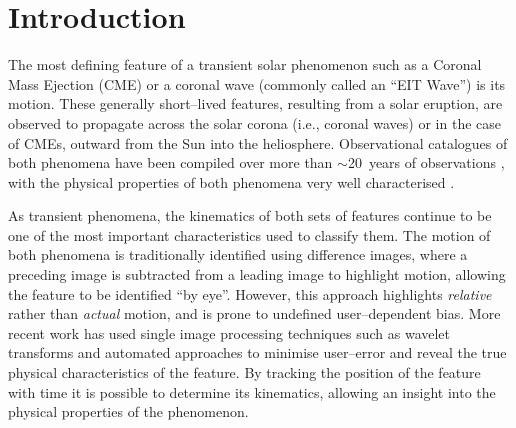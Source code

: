 \documentclass[structabstract]{aa}
\begin{document}
\maketitle

%

\section{Introduction}
\label{sect_intro}

The most defining feature of a transient solar phenomenon such as a Coronal Mass Ejection (CME) or a coronal wave (commonly called an ``EIT Wave'') is its motion. These generally short--lived features, resulting from a solar eruption, are observed to propagate across the solar corona (i.e., coronal waves) or in the case of CMEs, outward from the Sun into the heliosphere. 
Observational catalogues of both phenomena have been compiled over more than $\sim$20~years of observations \citep[e.g.,][]{1985JGR....90..275I,2004JGRA..10907105Y,2009ApJS..183..225T}, with the physical properties of both phenomena very well characterised \citep[see the recent reviews by e.g., ][]{2011SSRv..158..365G,2012SoPh..tmp...93P,2011ASSL..376.....H,2012LRSP....9....3W}. 

As transient phenomena, the kinematics of both sets of features continue to be one of the most important characteristics used to classify them. The motion of both phenomena is traditionally identified using difference images, where a preceding image is subtracted from a leading image to highlight motion, allowing the feature to be identified ``by eye''. However, this approach highlights \emph{relative} rather than \emph{actual} motion, and is prone to undefined user--dependent bias. More recent work has used single image processing techniques such as wavelet transforms \citep{2009A&A...495..325B,2012ApJ...752..144M} and automated approaches \citep[e.g.,][]{2011A&A...531A..42L,2012ApJ...752..145B,2012SoPh..276..479P} to minimise user--error and reveal the true physical characteristics of the feature. By tracking the position of the feature with time it is possible to determine its kinematics, allowing an insight into the physical properties of the phenomenon. 
\end{document}
